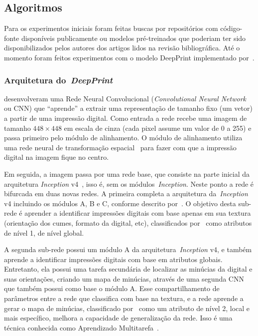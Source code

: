 \subsection{Algoritmos}\label{subsec:algoritmos}

Para os experimentos iniciais foram feitas buscas por repositórios com código-fonte disponíveis publicamente ou modelos pré-treinados que poderiam ter sido disponibilizados pelos autores dos artigos lidos na revisão bibliográfica. Até o momento foram feitos experimentos com o modelo {DeepPrint} implementado por~.


\subsubsection{Arquitetura do~\textit{DeepPrint}}\label{subsubsec:deepprint-arch}

 desenvolveram uma Rede Neural Convolucional (\textit{Convolutional Neural Network} ou CNN) que ``aprende'' a extrair uma representação de tamanho fixo (um vetor) a partir de uma impressão digital. Como entrada a rede recebe uma imagem de tamanho $448 \times 448$ em escala de cinza (cada pixel assume um valor de 0 a 255) e passa primeiro pelo módulo de alinhamento. O módulo de alinhamento utiliza uma rede neural de transformação espacial~\cite{spatial-transformer-networks} para fazer com que a impressão digital na imagem fique no centro. 

Em seguida, a imagem passa por uma rede base, que consiste na parte inicial da arquitetura \textit{Inception} v4~\cite{inception-v4}, isso é, sem os módulos~\textit{Inception}. Neste ponto a rede é bifurcada em duas novas redes. A primeira completa a arquitetura da~\textit{Inception} v4 incluindo os módulos A, B e C, conforme descrito por~. O objetivo desta sub-rede é aprender a identificar impressões digitais com base apenas em sua textura (orientação dos cumes, formato da digital, etc), classificados por~ como atributos de nível 1, de nível global.

A segunda sub-rede possui um módulo A da arquitetura~\textit{Inception} v4, e também aprende a identificar impressões digitais com base em atributos globais. Entretanto, ela possui uma tarefa secundária de localizar as minúcias da digital e suas orientações, criando um mapa de minúcias, através de uma segunda CNN que também possui como base o módulo A. Esse compartilhamento de parâmetros entre a rede que classifica com base na textura, e a rede aprende a gerar o mapa de minúcias, classificado por~ como um atributo de nível 2, local e mais específico, melhora a capacidade de generalização da rede. Isso é uma técnica conhecida como Aprendizado Multitarefa~\cite{multitask-learning}.

